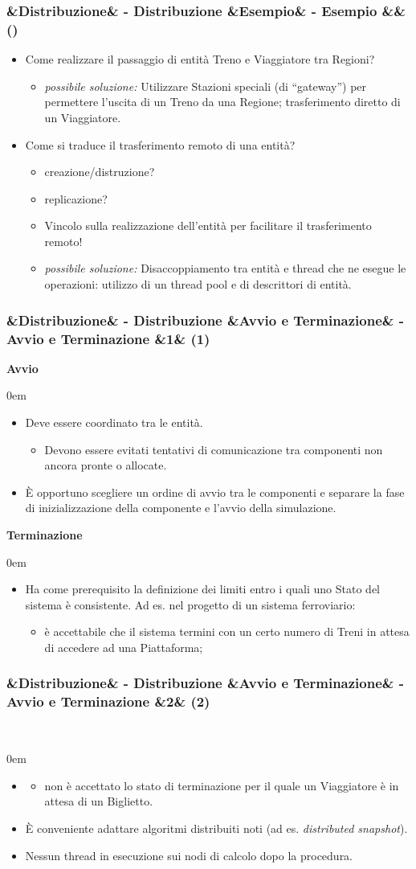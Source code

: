 \documentclass[slidestop,compress,blackandwhite]{beamer}
\newcommand{\ii}[1]{\textit{#1}}
\newcommand{\cm}[1]{\vspace{#1cm}}
\newcommand{\describe}[2]{
	\textbf{#1}\\
	\begin{addmargin}[2em]{0em}
		#2
	\end{addmargin}
}
\newcommand{\newtitle}[4]{
	#1 
	\ifx&#2&%
	\else
  		\large- #2
	\fi
	\ifx&#3&%
	\else
  		\normalsize- #3
	\fi
	\ifx&#4&%
	\else
  		\normalsize (#4)
	\fi
}
\newcommand{\newframe}[5]{
	\begin{frame}
		\frametitle{\newtitle{#1}{#2}{#3}{#4}}
		#5
	\end{frame}
}
\newcommand{\myitemize}[1]{
	\begin{itemize}\itemsep4pt
	#1
	\end{itemize}
}
\begin{document}
	\newframe{}{Distribuzione}{Esempio}{} {
		\myitemize {
			\item Come realizzare il passaggio di entità Treno e Viaggiatore tra Regioni?
				\myitemize {
					\item \ii{possibile soluzione:} Utilizzare Stazioni speciali (di ``gateway'') per permettere l'uscita di un Treno da una Regione; trasferimento diretto di un Viaggiatore.
				}
			\item Come si traduce il trasferimento remoto di una entità?
				\myitemize {
					\item creazione/distruzione?
					\item replicazione?
					\item Vincolo sulla realizzazione dell'entità per facilitare il trasferimento remoto!
					\item \ii{possibile soluzione:} Disaccoppiamento tra entità e thread che ne esegue le operazioni: utilizzo di un thread pool e di descrittori di entità.
				}
		}
	}
	
	\newframe{}{Distribuzione}{Avvio e Terminazione}{1}{
		\justifying
		\describe{Avvio}{
			\myitemize{
				\item Deve essere coordinato tra le entità.
					\myitemize {
						\item Devono essere evitati tentativi di comunicazione tra componenti non ancora pronte o allocate.
					}
				\item \`E opportuno scegliere un ordine di avvio tra le componenti e separare la fase di inizializzazione della componente e l'avvio della simulazione.
			}
		}
		\cm{0.1}
		\describe{Terminazione}{
			\myitemize{
				\item Ha come prerequisito la definizione dei limiti entro i quali uno Stato del sistema è consistente. Ad es. nel progetto di un sistema ferroviario:
					\myitemize {
						\item è accettabile che il sistema termini con un certo numero di Treni in attesa di accedere ad una Piattaforma;
					} 
			}
		}
	}
	
	\newframe{}{Distribuzione}{Avvio e Terminazione}{2}{
		\describe{}{
			\myitemize {
				\item[]
					\myitemize {
						\item non è accettato lo stato di terminazione per il quale un Viaggiatore è in attesa di un Biglietto.
					}
				\item \`E conveniente adattare algoritmi distribuiti noti (ad es. \ii{distributed snapshot}).
				\item Nessun thread in esecuzione sui nodi di calcolo dopo la procedura.
			}
		}
	}
	
\end{document}
